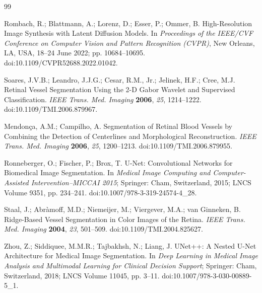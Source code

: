 \documentclass[jimaging,article,submit,pdftex,moreauthors]{Definitions/mdpi}%
\providecommand{\href}[2]{#2}
\begin{document}
\begin{thebibliography}{99}

Rombach, R.; Blattmann, A.; Lorenz, D.; Esser, P.; Ommer, B. High-Resolution Image Synthesis with Latent Diffusion Models. In \textit{Proceedings of the IEEE/CVF Conference on Computer Vision and Pattern Recognition (CVPR)}, New Orleans, LA, USA, 18--24 June 2022; pp. 10684--10695. \href{https://doi.org/10.1109/CVPR52688.2022.01042}{doi:10.1109/CVPR52688.2022.01042}.




Soares, J.V.B.; Leandro, J.J.G.; Cesar, R.M., Jr.; Jelinek, H.F.; Cree, M.J. Retinal Vessel Segmentation Using the 2-D Gabor Wavelet and Supervised Classification. \textit{IEEE Trans. Med. Imaging} \textbf{2006}, \textit{25}, 1214--1222. \href{https://doi.org/10.1109/TMI.2006.879967}{doi:10.1109/TMI.2006.879967}.




Mendon\c{c}a, A.M.; Campilho, A. Segmentation of Retinal Blood Vessels by Combining the Detection of Centerlines and Morphological Reconstruction. \textit{IEEE Trans. Med. Imaging} \textbf{2006}, \textit{25}, 1200--1213. \href{https://doi.org/10.1109/TMI.2006.879955}{doi:10.1109/TMI.2006.879955}.




Ronneberger, O.; Fischer, P.; Brox, T. U-Net: Convolutional Networks for Biomedical Image Segmentation. In \textit{Medical Image Computing and Computer-Assisted Intervention--MICCAI 2015}; Springer: Cham, Switzerland, 2015; LNCS Volume 9351, pp. 234--241. \href{https://doi.org/10.1007/978-3-319-24574-4_28}{doi:10.1007/978-3-319-24574-4\_28}.




Staal, J.; Abr\`amoff, M.D.; Niemeijer, M.; Viergever, M.A.; van Ginneken, B. Ridge-Based Vessel Segmentation in Color Images of the Retina. \textit{IEEE Trans. Med. Imaging} \textbf{2004}, \textit{23}, 501--509. \href{https://doi.org/10.1109/TMI.2004.825627}{doi:10.1109/TMI.2004.825627}.




Zhou, Z.; Siddiquee, M.M.R.; Tajbakhsh, N.; Liang, J. UNet++: A Nested U-Net Architecture for Medical Image Segmentation. In \textit{Deep Learning in Medical Image Analysis and Multimodal Learning for Clinical Decision Support}; Springer: Cham, Switzerland, 2018; LNCS Volume 11045, pp. 3--11. \href{https://doi.org/10.1007/978-3-030-00889-5_1}{doi:10.1007/978-3-030-00889-5\_1}.




\end{thebibliography}
\end{document}
